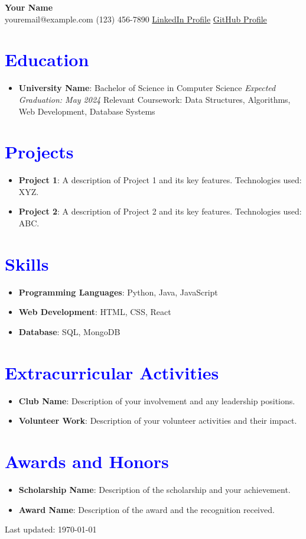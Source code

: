 \documentclass[letterpaper, 10pt]{article}
\makeatletter
\newcommand{\resumeSection}[1]{\section*{\textcolor{blue}{\large #1}}}
\newcommand{\resumeItem}[2]{\item \textbf{#1}: #2}
\newcommand{\resumeSubItem}[1]{\hspace{12pt}\textbullet\hspace{6pt}#1}
\newcommand{\Name}{Your Name}
\newcommand{\Email}{youremail@example.com}
\newcommand{\Phone}{(123) 456-7890}
\newcommand{\LinkedIn}{\href{https://www.linkedin.com/in/your-profile}{LinkedIn Profile}}
\newcommand{\GitHub}{\href{https://github.com/yourusername}{GitHub Profile}}
\makeatother
\begin{document}
\begin{center}
    \textbf{\Huge \Name}\\
    \vspace{4pt}
    \small \Email \hspace{10pt} \textbullet \hspace{10pt} \Phone \hspace{10pt} \textbullet \hspace{10pt} \LinkedIn \hspace{10pt} \textbullet \hspace{10pt} \GitHub
\end{center}

\resumeSection{Education}
\begin{itemize}[leftmargin=*, label={}]
    \resumeItem{University Name}{Bachelor of Science in Computer Science \hfill \textit{Expected Graduation: May 2024}}
    \resumeSubItem{Relevant Coursework: Data Structures, Algorithms, Web Development, Database Systems}
\end{itemize}

\resumeSection{Projects}
\begin{itemize}[leftmargin=*]
    \resumeItem{Project 1}{A description of Project 1 and its key features. Technologies used: XYZ.}
    \resumeItem{Project 2}{A description of Project 2 and its key features. Technologies used: ABC.}
\end{itemize}

\resumeSection{Skills}
\begin{itemize}[leftmargin=*]
    \resumeItem{Programming Languages}{Python, Java, JavaScript}
    \resumeItem{Web Development}{HTML, CSS, React}
    \resumeItem{Database}{SQL, MongoDB}
\end{itemize}

\resumeSection{Extracurricular Activities}
\begin{itemize}[leftmargin=*]
    \resumeItem{Club Name}{Description of your involvement and any leadership positions.}
    \resumeItem{Volunteer Work}{Description of your volunteer activities and their impact.}
\end{itemize}

\resumeSection{Awards and Honors}
\begin{itemize}[leftmargin=*]
    \resumeItem{Scholarship Name}{Description of the scholarship and your achievement.}
    \resumeItem{Award Name}{Description of the award and the recognition received.}
\end{itemize}

\begin{center}
    \footnotesize Last updated: \today
\end{center}
\end{document}
